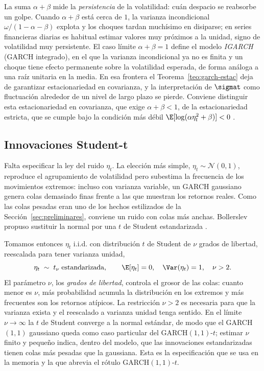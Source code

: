 La suma $\alpha + \beta$ mide la \emph{persistencia} de la volatilidad: cuán despacio se reabsorbe un golpe. Cuando $\alpha + \beta$ está cerca de $1$, la varianza incondicional $\omega/(1-\alpha-\beta)$ explota y los choques tardan muchísimo en disiparse; en series financieras diarias es habitual estimar valores muy próximos a la unidad, signo de volatilidad muy persistente. El caso límite $\alpha + \beta = 1$ define el modelo \emph{IGARCH} (GARCH integrado), en el que la varianza incondicional ya no es finita y un choque tiene efecto permanente sobre la volatilidad esperada, de forma análoga a una raíz unitaria en la media. En esa frontera el Teorema~\ref{teo:garch-estac} deja de garantizar estacionariedad en covarianza, y la interpretación de $\sigmat$ como fluctuación alrededor de un nivel de largo plazo se pierde. Conviene distinguir esta estacionariedad en covarianza, que exige $\alpha+\beta<1$, de la estacionariedad estricta, que se cumple bajo la condición más débil $\E[\log(\alpha \eta_t^2+\beta)]<0$ \cite{nelson1990}.

\subsection{Innovaciones Student-t}
\label{sec:garch-t}

Falta especificar la ley del ruido $\eta_t$. La elección más simple, $\eta_t \sim \mathcal{N}(0,1)$, reproduce el agrupamiento de volatilidad pero subestima la frecuencia de los movimientos extremos: incluso con varianza variable, un GARCH gaussiano genera colas demasiado finas frente a las que muestran los retornos reales. Como las colas pesadas eran uno de los hechos estilizados de la Sección~\ref{sec:preliminares}, conviene un ruido con colas más anchas. Bollerslev propuso sustituir la normal por una $t$ de Student estandarizada \cite{bollerslev1987}.

Tomamos entonces $\eta_t$ i.i.d. con distribución $t$ de Student de $\nu$ grados de libertad, reescalada para tener varianza unidad,
\[
\eta_t \;\sim\; t_\nu \;\text{estandarizada}, \qquad \E[\eta_t] = 0, \quad \Var(\eta_t) = 1, \quad \nu > 2.
\]
El parámetro $\nu$, los \emph{grados de libertad}, controla el grosor de las colas: cuanto menor es $\nu$, más probabilidad acumula la distribución en los extremos y más frecuentes son los retornos atípicos. La restricción $\nu > 2$ es necesaria para que la varianza exista y el reescalado a varianza unidad tenga sentido. En el límite $\nu \to \infty$ la $t$ de Student converge a la normal estándar, de modo que el GARCH$(1,1)$ gaussiano queda como caso particular del GARCH$(1,1)$-$t$; estimar $\nu$ finito y pequeño indica, dentro del modelo, que las innovaciones estandarizadas tienen colas más pesadas que la gaussiana. Esta es la especificación que se usa en la memoria y la que abrevia el rótulo GARCH$(1,1)$-$t$.

